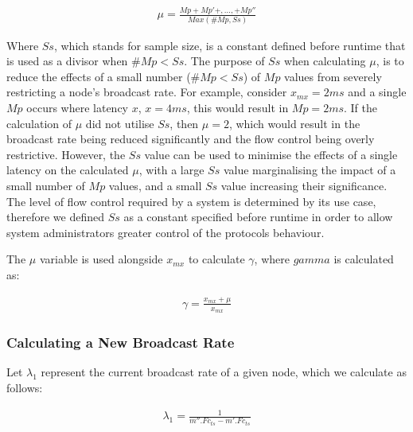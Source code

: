     \begin{equation*}
		     \begin{aligned}
		         \mu = \frac{Mp + Mp'+,\ldots,+ Mp''}{Max(\#Mp, Ss)}
		     \end{aligned}
    \end{equation*} 
    
    Where $Ss$, which stands for sample size, is a constant defined before runtime that is used as a divisor when $\#Mp < Ss$.  The purpose of $Ss$ when calculating $\mu$, is to reduce the effects of a small number ($\#Mp < Ss$) of $Mp$ values from severely restricting a node's broadcast rate.  For example, consider  $x_{mx} = 2ms$ and a single $Mp$ occurs where latency $x$, $x = 4ms$, this would result in $Mp = 2ms$.  If the calculation of $\mu$ did not utilise $Ss$, then $\mu = 2$, which would result in the broadcast rate being reduced significantly and the flow control being overly restrictive.  However, the $Ss$ value can be used to minimise the effects of a single latency on the calculated $\mu$, with a large $Ss$ value marginalising the impact of a small number of $Mp$ values, and a small $Ss$ value increasing their significance.  The level of flow control required by a system is determined by its use case, therefore we defined $Ss$ as a constant specified before runtime in order to allow system administrators greater control of the protocols behaviour.  
    
    The $\mu$ variable is used alongside $x_{mx}$ to calculate $\gamma$, where $gamma$ is calculated as:
    
    \begin{equation*}
		     \begin{aligned}
		         \gamma = \frac{x_{mx} + \mu}{x_{mx}}
		     \end{aligned}
    \end{equation*} 
    
    \subsubsection*{Calculating a New Broadcast Rate}
    Let $\lambda_1$ represent the current broadcast rate of a given node, which we calculate as follows:

    \begin{equation*}
		     \begin{aligned}
		         \lambda_1 = \frac{1}{m''.Fc_{ts} - m'.Fc_{ts}}
		     \end{aligned}
    \end{equation*} 
    
